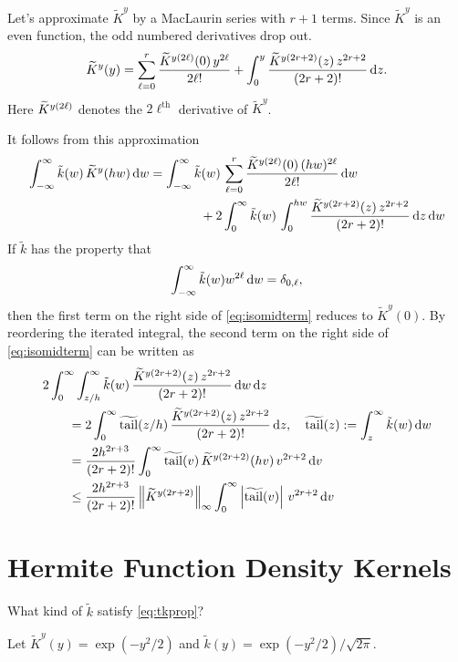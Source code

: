 \documentclass[letterpaper]{amsart}
\newcommand{\tKY}{\widetilde{K}^y}
\newcommand{\tk}{\tilde{k}}
\DeclareMathOperator{\ttk}{\widetilde{tail}}
\begin{document}
Let's approximate $\tKY$ by a MacLaurin series with $r+1$ terms.  Since $\tKY$ is an even function, the odd numbered derivatives drop out.
\begin{equation*}
	\tKY(y)  = \sum_{\ell = 0}^{r} \frac{\tK^{y(2\ell)}(0) \, y^{2\ell}}{2\ell!} + \int_0^y \frac{\tK^{y(2r+2)}(z) \,  z^{2r+2}}{(2r+2)!} \, \dif z.
\end{equation*}
Here $\widetilde{K}^{y(2\ell)}$ denotes the $2\ell^{\text{th}}$ derivative of $\tKY$. 

It follows from this approximation 
\begin{align} \label{eq:isomidterm}
	\int_{-\infty}^{\infty} \tk(w) \, \tKY(hw) \, \dif w & = 
	\int_{-\infty}^{\infty} \tk(w) \, \sum_{\ell = 0}^{r} \frac{\tK^{y(2\ell)}(0) \, (hw)^{2\ell}}{2\ell!}  \, \dif w \\
	& 
	\nonumber
	\qquad \qquad 
	+ 2 \int_{0}^{\infty} \tk(w) \,  \int_0^{hw} \frac{\tK^{y(2r+2)}(z) \,  z^{2r+2}}{(2r+2)!} \, \dif z  \, \dif w
\end{align}
If $\tk$ has the property that 
\begin{equation} \label{eq:tkprop}
	\int_{-\infty}^{\infty} \tk(w) w^{2\ell}  \, \dif w =  \delta_{0,\ell},
\end{equation} 
then the first term on the right side of \eqref{eq:isomidterm} reduces to $\tKY(0)$.   By reordering the iterated integral, the  second term on the right side of  \eqref{eq:isomidterm} can be written as 
\begin{align*}
	\MoveEqLeft{2 \int_{0}^{\infty}  \int_{z/h}^\infty \tk(w) \, \frac{\tK^{y(2r+2)}(z) \,  z^{2r+2}}{(2r+2)!}   \, \dif w \, \dif z} \\
	& =  2\int_{0}^{\infty}  \ttk(z/h) \, \frac{\tK^{y(2r+2)}(z) \,  z^{2r+2}}{(2r+2)!}    \, \dif z, 
	\quad \ttk(z) := \int_{z}^\infty \tk(w) \, \dif w \\
	& =  \frac{2h^{2r+3}}{(2r+2)!} \int_{0}^{\infty}  \ttk(v) \, \tK^{y(2r+2)}(hv) \,  v^{2r+2}    \, \dif v \\	
	&  \le  \frac{2h^{2r+3}}{(2r+2)!}  \norm[\infty]{\tK^{y(2r+2)}} \int_{0}^{\infty}  \abs{\ttk(v)}  \,  v^{2r+2}    \, \dif v \\	
\end{align*}

\section{Hermite Function Density Kernels}

What kind of $\tk$ satisfy \eqref{eq:tkprop}?













Let $\tKY(y) = \exp(-y^2/2)$ and $\tk(y) = \exp(-y^2/2)/\sqrt{2\pi}$.



\end{document}

